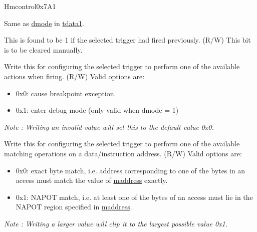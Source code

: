 \begin{register}{H}{mcontrol}{0x7A1}\label{regdesc:MCONTROL}
%
%
%
%
%
%
%
%
%
%
%
%
%
%
\regnewline%
\begin{regdesc}\begin{reglist}
\label{fielddesc:MCONTROLDMODE}\item [dmode] Same as \hyperref[fielddesc:TDATA1DMODE]{dmode} in \hyperref[regdesc:TDATA1]{tdata1}.
\label{fielddesc:MCONTROLHIT}\item [hit] This is found to be 1 if the selected trigger had fired previously. (R/W) \newline This bit is to be cleared manually.
\label{fielddesc:MCONTROLACTION}\item [action] Write this for configuring the selected trigger to perform one of the available actions when firing. (R/W)
\newline Valid options are:
\begin{itemize}
    \setlength\itemsep{-1em}
    \item 0x0: cause breakpoint exception.
    \item 0x1: enter debug mode (only valid when dmode = 1)
\end{itemize}
\textit{Note : Writing an invalid value will set this to the default value 0x0.}
\label{fielddesc:MCONTROLMATCH}\item [match] Write this for configuring the selected trigger to perform one of the available matching operations on a data/instruction address. (R/W)
Valid options are:
\begin{itemize}
    \setlength\itemsep{-1em}
    \item 0x0: exact byte match, i.e. address corresponding to one of the bytes in an access must match the value of \hyperref[regdesc:MADDRESS]{maddress} exactly.
    \item 0x1: NAPOT match, i.e. at least one of the bytes of an access must lie in the NAPOT region specified in \hyperref[regdesc:MADDRESS]{maddress}.
\end{itemize}
\textit{Note : Writing a larger value will clip it to the largest possible value 0x1.}

\end{reglist}
\end{regdesc}
\end{register}
